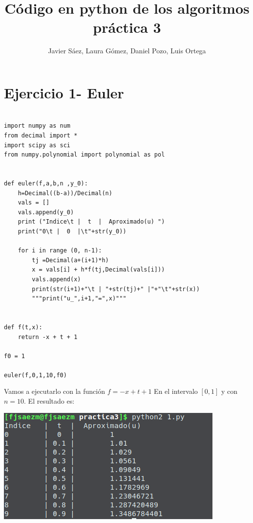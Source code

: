 \documentclass[11pt]{article}
\title{\textbf{Código en python de los algoritmos práctica 3}}
\author{Javier Sáez, Laura Gómez, Daniel Pozo, Luis Ortega}
\date{}
\begin{document}
\maketitle


\section{Ejercicio 1- Euler}
\begin{lstlisting}

import numpy as num
from decimal import *
import scipy as sci
from numpy.polynomial import polynomial as pol


def euler(f,a,b,n ,y_0):
    h=Decimal((b-a))/Decimal(n)
    vals = []
    vals.append(y_0)
    print ("Indice\t |  t  |  Aproximado(u) ")
    print("0\t |  0  |\t"+str(y_0)) 
    
    for i in range (0, n-1):
        tj =Decimal(a+(i+1)*h)
        x = vals[i] + h*f(tj,Decimal(vals[i]))
        vals.append(x)
        print(str(i+1)+"\t | "+str(tj)+" |"+"\t"+str(x))
        """print("u_",i+1,"=",x)"""


def f(t,x):
    return -x + t + 1

f0 = 1

euler(f,0,1,10,f0)
\end{lstlisting}
Vamos a ejecutarlo con la función $f = -x+t+1$
En el intervalo $[0,1]$ y con $n=10$.
El resultado es:
\begin{center}
  \includegraphics[scale=0.8]{1.png}
\end{center}
\end{document}
